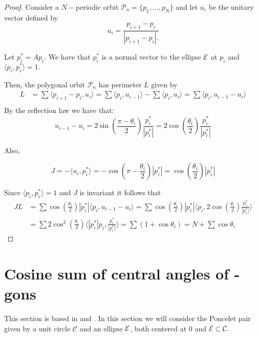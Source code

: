 \begin{proof} Consider a $N-$periodic orbit $\mathcal{P}_n=\{p_1,\ldots, p_N\}$ and let $u_i$ be the unitary vector defined by 
\[u_i=\frac{p_{i+1}-p_i}{|p_{i+1}-p_i|.}\]

Let $p_i^*=Ap_i$. We have that $p_i^*$ is a normal vector to the ellipse $\mathcal{E}$ at $p_i$ and $\langle p_i,p_i^*\rangle=1.$

Then, the polygonal orbit $\mathcal{P}_n$ has perimeter $L$ given by 
\begin{align*}
    L&= \sum \langle p_{i+1}-p_i, u_i\rangle=\sum \langle p_{i} , u_{i-1}\rangle-\sum \langle  p_i, u_i\rangle=\sum \langle p_i, u_{i-1}-u_{i}\rangle\\
\end{align*}
By the reflection law we have that:
\[u_{i-1}-u_i=2\sin\left(\frac{\pi-\theta_i}{2}\right)\frac{p_i^*}{|p_i^*|}=2\cos\left(\frac{\theta_i}{2}\right)\frac{p_i^*}{|p_i^*|}\]

Also,

\[J=-\langle u_i,p_i^* \rangle=-\cos\left(\pi-\frac{\theta_i}{2}\right)|p_i^*|=\cos\left(\frac{\theta_i}{2}\right)|p_i^*|\]

Since $\langle p_i,p_i^*\rangle=1$ and $J$ is invariant it follows that
\begin{align*}
JL&=\sum \cos\left(\frac{\theta_i}{2}\right)|p_i^*|\langle p_i, u_{i-1}-u_{i}\rangle=
\sum \cos\left(\frac{\theta_i}{2}\right)|p_i^*|\langle p_i,2\cos\left(\frac{\theta_i}{2}\right)\frac{p_i^*}{|p_i^*|}\rangle\\
&=\sum 2\cos^2\left( \frac{\theta_i}{2}\right)\langle |p_i^*|p_i, \frac{p_i^*}{|p_i^*|}\rangle=\sum (1+\cos\theta_i)= N+\sum\cos\theta_i
%
\end{align*}
\end{proof}


 \section{  Cosine sum of central angles of -gons }
 
This section is based in \cite{akopyan2020-invariants} and
\cite{bialy2020-invariants}. 
In this section we will consider the Poncelet pair given by a unit circle $\mathcal{C}$ and an ellipse $\mathcal{E}$, both centered at $0$ and 
$\mathcal{E}\subset \mathcal{C}.$

